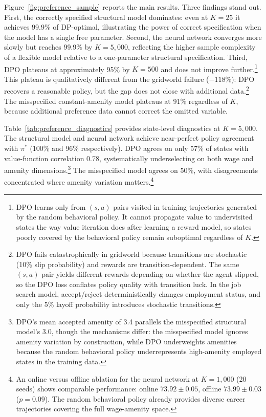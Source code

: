 Figure~\ref{fig:preference_sample} reports the main results. Three findings stand out. First, the correctly specified structural model dominates: even at $K = 25$ it achieves 99.9\% of DP-optimal, illustrating the power of correct specification when the model has a single free parameter. Second, the neural network converges more slowly but reaches 99.9\% by $K = 5{,}000$, reflecting the higher sample complexity of a flexible model relative to a one-parameter structural specification. Third, DPO plateaus at approximately 95\% by $K = 500$ and does not improve further.\footnote{DPO learns only from $(s,a)$ pairs visited in training trajectories generated by the random behavioral policy. It cannot propagate value to undervisited states the way value iteration does after learning a reward model, so states poorly covered by the behavioral policy remain suboptimal regardless of $K$.} This plateau is qualitatively different from the gridworld failure ($-118\%$): DPO recovers a reasonable policy, but the gap does not close with additional data.\footnote{DPO fails catastrophically in gridworld because transitions are stochastic (10\% slip probability) and rewards are transition-dependent. The same $(s,a)$ pair yields different rewards depending on whether the agent slipped, so the DPO loss conflates policy quality with transition luck. In the job search model, accept/reject deterministically changes employment status, and only the 5\% layoff probability introduces stochastic transitions.} The misspecified constant-amenity model plateaus at 91\% regardless of $K$, because additional preference data cannot correct the omitted variable.

\begin{table}[htbp]
\centering
\caption[Diagnostics at $K = 5{,}000$: policy agreement with $\pi^*$, value-function correlation, and mean accepted wage and amenity for each method]{\textbf{Diagnostics at $K = 5{,}000$ (single seed): policy agreement with $\pi^*$, value-function correlation, and mean accepted wage and amenity for each method.}}
\label{tab:preference_diagnostics}

\end{table}

Table~\ref{tab:preference_diagnostics} provides state-level diagnostics at $K = 5{,}000$. The structural model and neural network achieve near-perfect policy agreement with $\pi^*$ (100\% and 96\% respectively). DPO agrees on only 57\% of states with value-function correlation 0.78, systematically underselecting on both wage and amenity dimensions.\footnote{DPO's mean accepted amenity of 3.4 parallels the misspecified structural model's 3.0, though the mechanisms differ: the misspecified model ignores amenity variation by construction, while DPO underweights amenities because the random behavioral policy underrepresents high-amenity employed states in the training data.} The misspecified model agrees on 50\%, with disagreements concentrated where amenity variation matters.\footnote{An online versus offline ablation for the neural network at $K = 1{,}000$ (20 seeds) shows comparable performance: online $73.92 \pm 0.05$, offline $73.99 \pm 0.03$ ($p = 0.09$). The random behavioral policy already provides diverse career trajectories covering the full wage-amenity space.}

